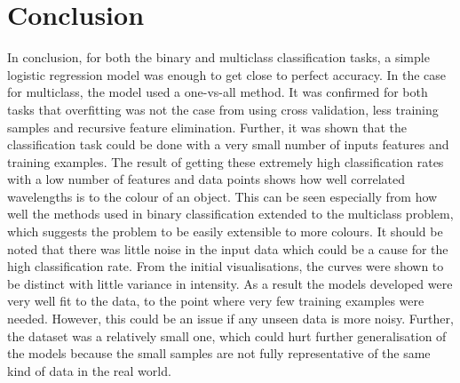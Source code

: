 \documentclass{article}
\begin{document}
\section{Conclusion}
In conclusion, for both the binary and multiclass classification tasks, a simple logistic regression model was enough to get close to perfect accuracy. In the case for multiclass, the model used a one-vs-all method. It was confirmed for both tasks that overfitting was not the case from using cross validation, less training samples and recursive feature elimination. Further, it was shown that the classification task could be done with a very small number of inputs features and training examples.
\n
The result of getting these extremely high classification rates with a low number of features and data points shows how well correlated wavelengths is to the colour of an object. This can be seen especially from how well the methods used in binary classification extended to the multiclass problem, which suggests the problem to be easily extensible to more colours. It should be noted that there was little noise in the input data which could be a cause for the high classification rate. From the initial visualisations, the curves were shown to be distinct with little variance in intensity. As a result the models developed were very well fit to the data, to the point where very few training examples were needed. However, this could be an issue if any unseen data is more noisy. Further, the dataset was a relatively small one, which could hurt further generalisation of the models because the small samples are not fully representative of the same kind of data in the real world. 
\end{document}
